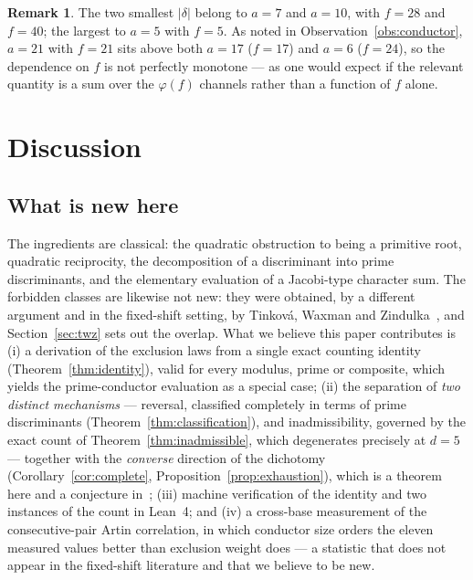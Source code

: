 \documentclass[11pt,reqno]{amsart}
\theoremstyle{plain}
\theoremstyle{definition}
\newtheorem{remark}[theorem]{Remark}
\begin{document}
\begin{remark}
The two smallest $|\delta|$ belong to $a = 7$ and $a = 10$, with $f = 28$ and
$f = 40$; the largest to $a = 5$ with $f = 5$. As noted in
Observation~\ref{obs:conductor}, $a = 21$ with $f = 21$ sits above both
$a = 17$ ($f = 17$) and $a = 6$ ($f = 24$), so the dependence on $f$ is not
perfectly monotone --- as one would expect if the relevant quantity is a sum
over the $\varphi(f)$ channels rather than a function of $f$ alone.
\end{remark}

\section{Discussion}
\label{sec:discussion}

\subsection*{What is new here}
The ingredients are classical: the quadratic obstruction to being a primitive
root, quadratic reciprocity, the decomposition of a discriminant into prime
discriminants, and the elementary evaluation of a Jacobi-type character sum. The forbidden classes
are likewise not new: they were obtained, by a different argument and in the
fixed-shift setting, by Tinkov\'a, Waxman and
Zindulka~\cite{TinkovaWaxmanZindulka2023}, and Section~\ref{sec:twz} sets out
the overlap. What we believe this paper contributes is
(i) a derivation of the exclusion laws from a single exact counting identity
(Theorem~\ref{thm:identity}), valid for every modulus, prime or composite,
which yields the prime-conductor evaluation as a special case;
(ii) the separation of \emph{two distinct mechanisms} --- reversal, classified
completely in terms of prime discriminants
(Theorem~\ref{thm:classification}), and inadmissibility, governed by the exact
count of Theorem~\ref{thm:inadmissible}, which degenerates precisely at
$d = 5$ --- together with the \emph{converse} direction of the dichotomy
(Corollary~\ref{cor:complete}, Proposition~\ref{prop:exhaustion}), which is a
theorem here and a conjecture in~\cite{TinkovaWaxmanZindulka2023};
(iii) machine verification of the identity and two instances of the count in
Lean~4; and (iv) a cross-base measurement of the consecutive-pair Artin
correlation, in which conductor size orders the eleven measured values better
than exclusion weight does --- a statistic that does not appear in the
fixed-shift literature and that we believe to be new.
\end{document}
